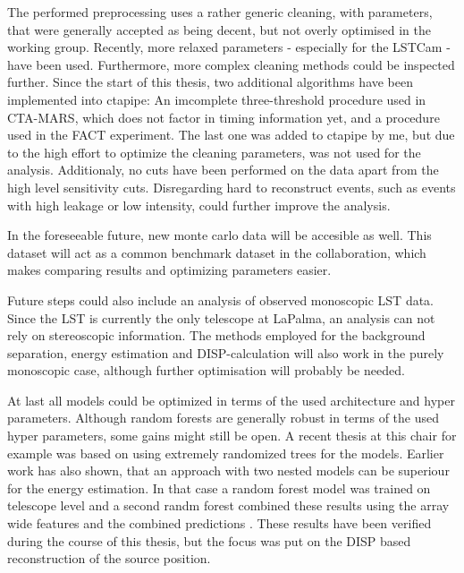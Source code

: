 The performed preprocessing uses a rather generic cleaning, with
parameters, that were generally accepted as being 
decent, but not overly optimised in the working group. Recently, 
more relaxed parameters - especially for the LSTCam - have been used.
Furthermore, more complex cleaning methods could be inspected further.
Since the start of this thesis, two additional algorithms have been 
implemented into ctapipe:
An imcomplete three-threshold procedure used in CTA-MARS, which does not factor 
in timing information yet, and a procedure used in the FACT experiment.
The last one was added to ctapipe by me, but due to the high effort to
optimize the cleaning parameters, was not used for the analysis.
Additionaly, no cuts have been performed on the data apart from
the high level sensitivity cuts. Disregarding hard to reconstruct
events, such as events with high leakage or low intensity,
could further improve the analysis.

In the foreseeable future, new monte carlo data will be accesible as well.
This dataset will act as a common benchmark dataset in the collaboration,
which makes comparing results and optimizing parameters easier.

Future steps could also include an analysis of observed monoscopic 
LST data. Since the LST is currently the only telescope 
at LaPalma, an analysis can not rely on stereoscopic information.
The methods employed for the background separation, energy estimation and 
DISP-calculation will also work in the purely monoscopic case, although further
optimisation will probably be needed.

At last all models could be optimized in terms of the used architecture and
hyper parameters. Although random forests are generally 
robust in terms of the used hyper parameters, some gains might still be 
open. 
A recent thesis at this chair for example was based on using
extremely randomized trees for the models.
Earlier work has also shown, that an approach with two nested models
can be superiour for the energy estimation. In that case
a random forest model was trained on telescope level and
a second randm forest combined these results using the
array wide features and the combined predictions \cite{ba-lars}.
These results have been verified during the course of this thesis,
but the focus was put on the DISP based reconstruction of the
source position.